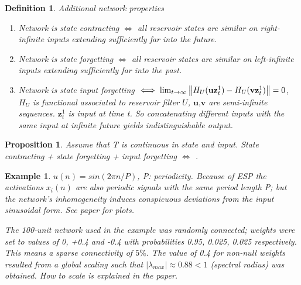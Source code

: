 \documentclass{article}
\newtheorem{definition}{Definition}
\newtheorem{proposition}{Proposition}
\newtheorem{example}{Example}
\begin{document}
\begin{definition} Additional network properties

\begin{enumerate}[label=\Roman*.]
    \item Network is state contracting $\iff$ all reservoir states are similar on right-infinite inputs extending sufficiently far into the future.
    
    \item Network is state forgetting $\iff$ all reservoir states are similar on left-infinite inputs extending sufficiently far into the past.
    
    \item Network is state input forgetting $\iff \lim_{t\rightarrow \infty} \norm{H_U(\textbf{uz}_t^1) - H_U(\textbf{vz}_t^1)} = 0$, $H_U$ is functional associated to reservoir filter $U$, $\textbf{u,v}$ are semi-infinite sequences. $\textbf{z}_t^1$ is input at time t. So concatenating different inputs with the same input at infinite future yields indistinguishable output.
\end{enumerate}

\end{definition}

\begin{proposition}
Assume that T is continuous in state and input.
State contracting + state forgetting + input forgetting $\iff$ . 
\end{proposition}

\begin{example}
$u(n) = sin(2\pi n/P)$, P: periodicity. Because of ESP the activations $x_i(n)$ are also periodic signals with the same period length P; but the network’s inhomogeneity induces conspicuous deviations from the input sinusoidal form. See paper for plots.

The 100-unit network used in the example was randomly connected; weights were set to values of 0, +0.4 and -0.4 with probabilities 0.95, 0.025, 0.025 respectively. This means a sparse connectivity of $5\%$. The value of 0.4 for non-null weights resulted from a global scaling such that $| \lambda_{max} | \approx 0.88 < 1$ (spectral radius) was obtained. How to scale is explained in the paper.
\end{example}
\end{document}
